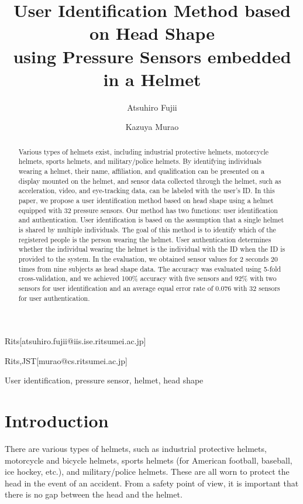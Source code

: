 \documentclass[english,preprint,JIP]{ipsj}
\begin{document}
\title{User Identification Method based on Head Shape\\
using Pressure Sensors embedded in a Helmet}


\author{Atsuhiro Fujii}{Rits}[atsuhiro.fujii@iis.ise.ritsumei.ac.jp]
\author{Kazuya Murao}{Rits,JST}[murao@cs.ritsumei.ac.jp]


\begin{abstract}
  Various types of helmets exist, including industrial protective helmets, motorcycle helmets, sports helmets, and military/police helmets. By identifying individuals wearing a helmet, their name, affiliation, and qualification can be presented on a display mounted on the helmet, and sensor data collected through the helmet, such as acceleration, video, and eye-tracking data, can be labeled with the user's ID. In this paper, we propose a user identification method based on head shape using a helmet equipped with 32 pressure sensors. Our method has two functions: user identification and authentication. User identification is based on the assumption that a single helmet is shared by multiple individuals. The goal of this method is to identify which of the registered people is the person wearing the helmet. User authentication determines whether the individual wearing the helmet is the individual with the ID when the ID is provided to the system. In the evaluation, we obtained sensor values for 2 seconds 20 times from nine subjects as head shape data. The accuracy was evaluated using 5-fold cross-validation, and we achieved 100\% accuracy with five sensors and 92\% with two sensors for user identification and an average equal error rate of 0.076 with 32 sensors for user authentication.
\end{abstract}

\begin{keyword}
User identification, pressure sensor, helmet, head shape
\end{keyword}

\maketitle

\section{Introduction}
\label{sec:introduction}
There are various types of helmets, such as industrial protective helmets, motorcycle and bicycle helmets, sports helmets (for American football, baseball, ice hockey, etc.), and military/police helmets. These are all worn to protect the head in the event of an accident\cite{helmet}. From a safety point of view, it is important that there is no gap between the head and the helmet.\par
\end{document}
